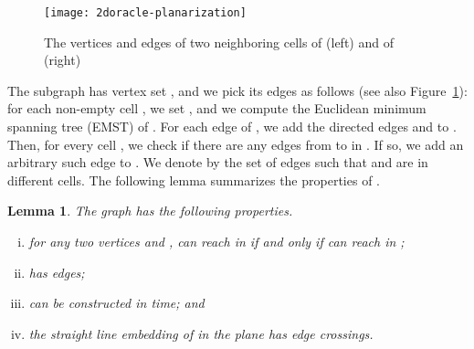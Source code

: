 \documentclass[11pt,a4paper]{paper}
\newtheorem{lemma}[theorem]{Lemma}
\begin{document}
\begin{figure}[htb]
\centering
\texttt{[image: 2doracle-planarization]}
\caption{The vertices and edges of two neighboring cells of  (left) and
 of  (right)}

 \label{fig:planarization}
\end{figure}

The subgraph  has vertex set , and we pick its edges as follows (see also
Figure~\ref{fig:planarization}):
for each non-empty cell , we
set , and
we compute the
Euclidean minimum spanning tree (EMST)  of .
For each edge  of , we add the directed edges
 and  to .
Then, for every cell
,
we check if there are any edges from  to  in . If so, we
add an arbitrary such edge to . We denote by
  the set of edges  such that  and  are in different cells.
The following lemma summarizes the properties of
.

\begin{lemma}
\label{lem:pruning}
The graph  has the following properties.
\begin{enumerate}[(i)]
\item for any two vertices  and ,  can reach  in  if and only if  can reach  in ;
\item  has  edges;
\item  can be constructed in  time;
and
\item the straight line embedding of  in the plane
has  edge crossings.
\end{enumerate}
\end{lemma}
\end{document}
